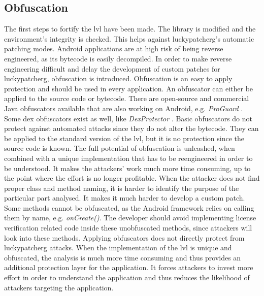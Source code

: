 \subsection{Obfuscation} \label{subsection:counter-improve-obfuscation}
The first steps to fortify the \gls{lvl} have been made.
The library is modified and the environment's integrity is checked.
This helps against \gls{luckypatcherg}'s automatic patching modes.
Android applications are at high risk of being reverse engineered, as its bytecode is easily decompiled.
In order to make reverse engineering difficult and delay the development of custom patches for \gls{luckypatcherg}, obfuscation is introduced.
\newline
Obfuscation is an easy to apply protection and should be used in every application.
An obfuscator can either be applied to the source code or bytecode.
There are open-source and commercial Java obfuscators available that are also working on Android, e.g. \textit{ProGuard} \cite{proguard}.
Some dex obfuscators exist as well, like \textit{DexProtector} \cite{dexProtector}.
\newline
Basic obfuscators do not protect against automated attacks since they do not alter the bytecode.
They can be applied to the standard version of the \gls{lvl}, but it is no protection since the source code is known.
The full potential of obfuscation is unleashed, when combined with a unique implementation that has to be reengineered in order to be understood.
It makes the attackers' work much more time consuming, up to the point where the effort is no longer profitable.
When the attacker does not find proper class and method naming, it is harder to identify the purpose of the particular part analysed.
It makes it much harder to develop a custom patch. \cite{developersSecuring}
\newline
Some methods cannot be obfuscated, as the Android framework relies on calling them by name, e.g. \textit{onCreate()}.
The developer should avoid implementing license verification related code inside these unobfuscated methods, since attackers will look into these methods.
\cite{developersSecuring}
\newline
\newline
Applying obfuscators does not directly protect from \gls{luckypatcherg} attacks.
When the implementation of the \gls{lvl} is unique and obfuscated, the analysis is much more time consuming and thus provides an additional protection layer for the application.
It forces attackers to invest more effort in order to understand the application and thus reduces the likelihood of attackers targeting the application.
